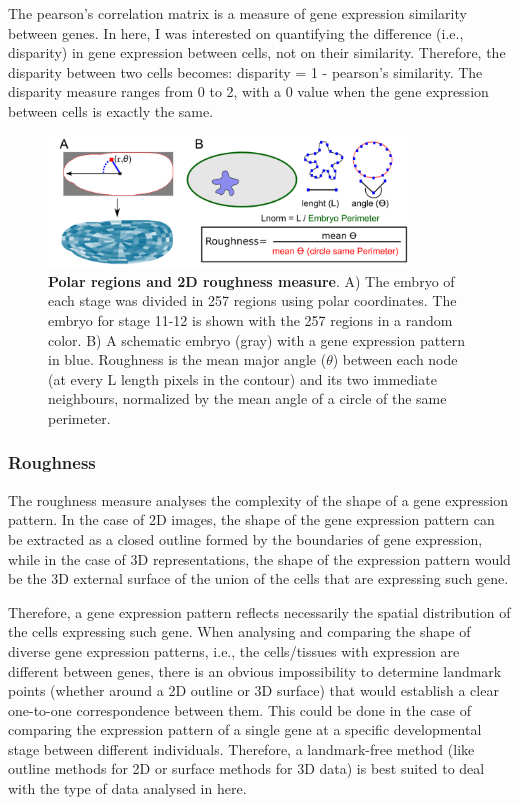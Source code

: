 The pearson's correlation matrix is a measure of gene expression similarity between genes. In here, I was interested on quantifying the difference (i.e., disparity) in gene expression between cells, not on their similarity. Therefore, the disparity between two cells becomes: disparity = 1 - pearson's similarity. The disparity measure ranges from 0 to 2, with a 0 value when the gene expression between cells is exactly the same.

\begin{figure}[h]
  \includegraphics[width=0.85\textwidth]{./Images/roughness_regions.png}
  \centering
  \caption{\textbf{Polar regions and 2D roughness measure}. A) The embryo of each stage was divided in 257 regions using polar coordinates. The embryo for stage 11-12 is shown with the 257 regions in a random color. B) A schematic embryo (gray) with a gene expression pattern in blue. Roughness is the mean major angle ($\theta$) between each node (at every L length pixels in the contour) and its two immediate neighbours, normalized by the mean angle of a circle of the same perimeter.
   }
  \label{fig:roughness_regions}
\end{figure}


\subsubsection{Roughness}

The roughness measure analyses the complexity of the shape of a gene expression pattern. In the case of 2D images, the shape of the gene expression pattern can be extracted as a closed outline formed by the boundaries of gene expression, while in the case of 3D representations, the shape of the expression pattern would be the 3D external surface of the union of the cells that are expressing such gene.

Therefore, a gene expression pattern reflects necessarily the spatial distribution of the cells expressing such gene. When analysing and comparing the shape of diverse gene expression patterns, i.e., the cells/tissues with expression are different between genes, there is an obvious impossibility to determine landmark points (whether around a 2D outline or 3D surface) that would establish a clear one-to-one correspondence between them. This could be done in the case of comparing the expression pattern of a single gene at a specific developmental stage between different individuals.
Therefore, a landmark-free method (like outline methods for 2D or surface methods for 3D data) is best suited to deal with the type of data analysed in here.

